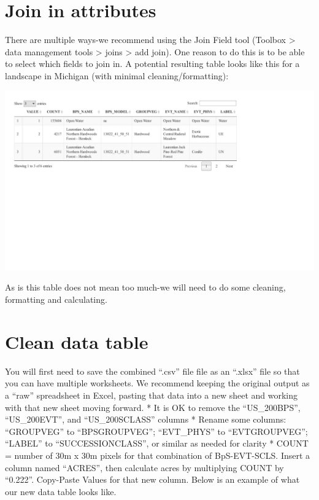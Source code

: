 \documentclass[
]{book}
\begin{document}
\hypertarget{join-in-attributes}{%
\section{Join in attributes}\label{join-in-attributes}}

There are multiple ways-we recommend using the Join Field tool (Toolbox \textgreater{} data management tools \textgreater{} joins \textgreater{} add join). One reason to do this is to be able to select which fields to join in. A potential resulting table looks like this for a landscape in Michigan (with minimal cleaning/formatting):

\includegraphics{FSCBook_files/figure-latex/combineDT-1.pdf}

As is this table does not mean too much-we will need to do some cleaning, formatting and calculating.

\hypertarget{clean-data-table}{%
\section{Clean data table}\label{clean-data-table}}

You will first need to save the combined ``.csv'' file file as an ``.xlsx'' file so that you can have multiple worksheets. We recommend keeping the original output as a ``raw'' spreadsheet in Excel, pasting that data into a new sheet and working with that new sheet moving forward.
* It is OK to remove the ``US\_200BPS'', ``US\_200EVT'', and ``US\_200SCLASS'' columns
* Rename some columns: ``GROUPVEG'' to ``BPSGROUPVEG''; ``EVT\_PHYS'' to ``EVTGROUPVEG''; ``LABEL'' to ``SUCCESSIONCLASS'', or similar as needed for clarity
* COUNT = number of 30m x 30m pixels for that combination of BpS-EVT-SCLS. Insert a column named ``ACRES'', then calculate acres by multiplying COUNT by ``0.222''. Copy-Paste Values for that new column. Below is an example of what our new data table looks like.
\end{document}
